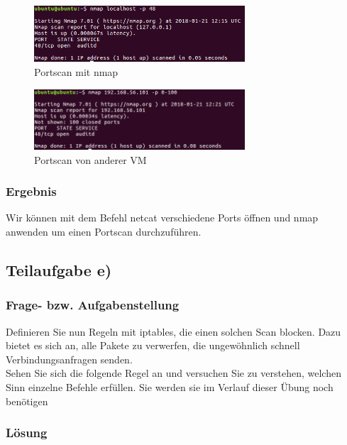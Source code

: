 \begin{figure}[htbp]
\begin{center}
\includegraphics[width=0.7\textwidth]{Bild2}
\caption{Portscan mit nmap}
\label{fig:Portscan}
\end{center}
\end{figure}

\begin{figure}[htbp]
\begin{center}
\includegraphics[width=0.7\textwidth]{Bild3}
\caption{Portscan von anderer VM}
\label{fig:Portscan2}
\end{center}
\end{figure}

\subsubsection{Ergebnis}

Wir können mit dem Befehl netcat verschiedene Ports öffnen und nmap anwenden um einen Portscan durchzuführen.

\subsection{Teilaufgabe e)}

\subsubsection{Frage- bzw. Aufgabenstellung}

Definieren Sie nun Regeln mit iptables, die einen solchen Scan blocken. Dazu bietet es sich an, alle Pakete zu verwerfen, die ungewöhnlich schnell Verbindungsanfragen senden. \\
Sehen Sie sich die folgende Regel an und versuchen Sie zu verstehen, welchen Sinn einzelne Befehle erfüllen. Sie werden sie im Verlauf dieser Übung noch benötigen

\subsubsection{Lösung}

